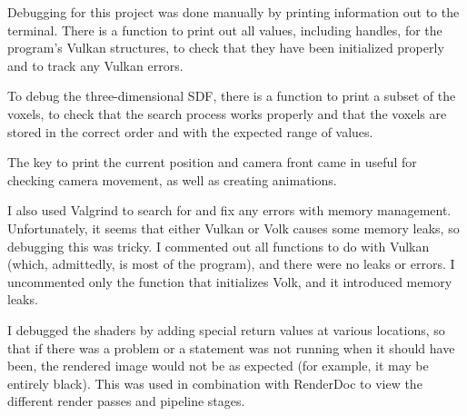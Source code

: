 Debugging for this project was done manually by printing information out to the terminal. There is a function to print out all values, including handles, for the program's Vulkan structures, to check that they have been initialized properly and to track any Vulkan errors.\newline

To debug the three-dimensional SDF, there is a function to print a subset of the voxels, to check that the search process works properly and that the voxels are stored in the correct order and with the expected range of values.\newline

The key to print the current position and camera front came in useful for checking camera movement, as well as creating animations.\newline

I also used Valgrind to search for and fix any errors with memory management. Unfortunately, it seems that either Vulkan or Volk causes some memory leaks, so debugging this was tricky. I commented out all functions to do with Vulkan (which, admittedly, is most of the program), and there were no leaks or errors. I uncommented only the function that initializes Volk, and it introduced memory leaks.\newline

I debugged the shaders by adding special return values at various locations, so that if there was a problem or a statement was not running when it should have been, the rendered image would not be as expected (for example, it may be entirely black). This was used in combination with RenderDoc to view the different render passes and pipeline stages.
